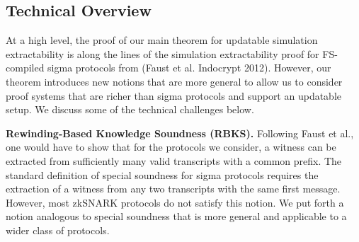 \documentclass[11pt]{llncs}
\newcommand{\oursubsub}[1] {\smallskip\noindent\textbf{#1}}
\begin{document}

\subsection{Technical Overview}
At a high level, the proof of our main theorem for updatable simulation
extractability is along the lines of the simulation extractability proof for
FS-compiled sigma protocols from (Faust et al. Indocrypt 2012). However, our theorem
introduces new notions that are more general to allow us to consider proof
systems that are richer than sigma protocols and support an updatable setup. We
discuss some of the technical challenges below.

\oursubsub{Rewinding-Based Knowledge Soundness (RBKS).}
Following Faust et al., one would have to show that for the protocols
we consider, a witness can be extracted from sufficiently many valid transcripts
with a common prefix. The standard definition of special soundness for sigma
protocols requires the extraction of a witness from any two transcripts with the
same first message. However, most zkSNARK protocols do not satisfy this notion.
We put forth a notion analogous to special soundness that is more general and
applicable to a wider class of protocols. 
\end{document}
